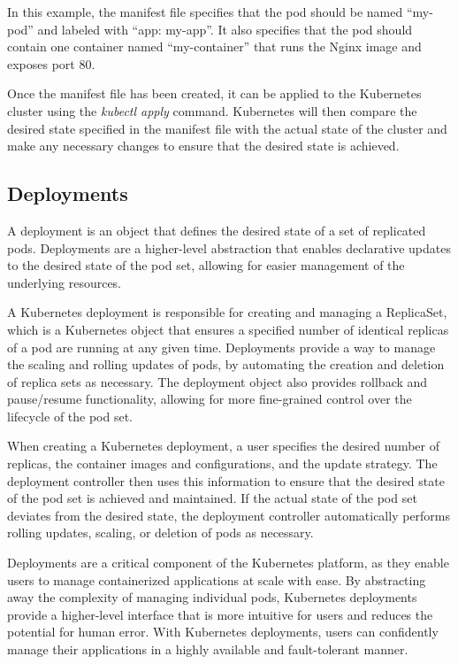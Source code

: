 \documentclass[
  11pt,
]{article}
\begin{document}
In this example, the manifest file specifies that the pod should be
named ``my-pod'' and labeled with ``app: my-app''. It also specifies
that the pod should contain one container named ``my-container'' that
runs the Nginx image and exposes port 80.

Once the manifest file has been created, it can be applied to the
Kubernetes cluster using the \emph{kubectl apply} command. Kubernetes
will then compare the desired state specified in the manifest file with
the actual state of the cluster and make any necessary changes to ensure
that the desired state is achieved.

\hypertarget{deployments}{%
\subsection{Deployments}\label{deployments}}

A deployment is an object that defines the desired state of a set of
replicated pods. Deployments are a higher-level abstraction that enables
declarative updates to the desired state of the pod set, allowing for
easier management of the underlying resources.

A Kubernetes deployment is responsible for creating and managing a
ReplicaSet, which is a Kubernetes object that ensures a specified number
of identical replicas of a pod are running at any given time.
Deployments provide a way to manage the scaling and rolling updates of
pods, by automating the creation and deletion of replica sets as
necessary. The deployment object also provides rollback and pause/resume
functionality, allowing for more fine-grained control over the lifecycle
of the pod set.

When creating a Kubernetes deployment, a user specifies the desired
number of replicas, the container images and configurations, and the
update strategy. The deployment controller then uses this information to
ensure that the desired state of the pod set is achieved and maintained.
If the actual state of the pod set deviates from the desired state, the
deployment controller automatically performs rolling updates, scaling,
or deletion of pods as necessary.

Deployments are a critical component of the Kubernetes platform, as they
enable users to manage containerized applications at scale with ease. By
abstracting away the complexity of managing individual pods, Kubernetes
deployments provide a higher-level interface that is more intuitive for
users and reduces the potential for human error. With Kubernetes
deployments, users can confidently manage their applications in a highly
available and fault-tolerant manner.
\end{document}
